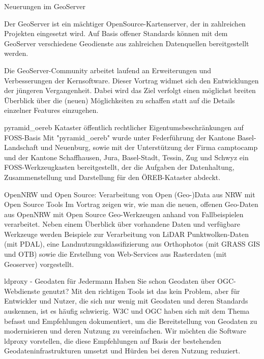 %
{Neuerungen im GeoServer}%
{}%
{
Der GeoServer ist ein mächtiger OpenSource-Kartenserver, der in zahlreichen Projekten eingesetzt wird. Auf Basis offener Standards können mit dem GeoServer verschiedene Geodienste aus zahlreichen Datenquellen bereitgestellt werden.

Die GeoServer-Community arbeitet laufend an Erweiterungen und Verbesserungen der Kernsoftware. Dieser Vortrag widmet sich den Entwicklungen der jüngeren Vergangenheit. Dabei wird das Ziel verfolgt einen möglichst breiten Überblick über die (neuen) Möglichkeiten zu schaffen statt auf die Details einzelner Features einzugehen.%
}

%
{pyramid\_oereb}%
{Kataster öffentlich rechtlicher Eigentumsbeschränkungen auf FOSS-Basis}%
{
Mit "pyramid\_oereb" wurde unter Federführung der Kantone Basel-Landschaft und Neuenburg, sowie mit der Unterstützung der Firma camptocamp und der Kantone Schaffhausen, Jura, Basel-Stadt, Tessin, Zug und Schwyz ein FOSS-Werkzeugkasten bereitgestellt, der die Aufgaben der Datenhaltung, Zusammenstellung und Darstellung für den ÖREB-Kataster abdeckt.%
}

%
{OpenNRW und Open Source: Verarbeitung von Open (Geo-)Data aus NRW mit Open Source Tools}%
{}%
{
Im Vortrag zeigen wir, wie man die neuen, offenen Geo-Daten aus OpenNRW mit Open Source Geo-Werkzeugen anhand von Fallbeispielen verarbeitet. Neben einem Überblick über vorhandene Daten und verfügbare Werkzeuge werden Beispiele zur Verarbeitung von LiDAR Punktwolken-Daten (mit PDAL), eine Landnutzungsklassifizierung aus Orthophotos (mit GRASS GIS und OTB) sowie die Erstellung von Web-Services aus Rasterdaten (mit Geoserver) vorgestellt.%
}

%
{ldproxy - Geodaten für Jedermann}%
{}%
{
Haben Sie schon Geodaten über OGC-Webdienste genutzt? Mit den richtigen Tools ist das kein Problem, aber für Entwickler und Nutzer, die sich nur wenig mit Geodaten und deren Standards auskennen, ist es häufig schwierig. W3C und OGC haben sich mit dem Thema befasst und Empfehlungen dokumentiert, um die Bereitstellung von Geodaten zu modernisieren und deren Nutzung zu vereinfachen. Wir möchten die Software ldproxy vorstellen, die diese Empfehlungen auf Basis der bestehenden Geodateninfrastrukturen umsetzt und Hürden bei deren Nutzung reduziert.%
}

